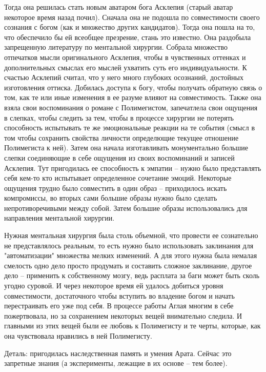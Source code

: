 \documentclass[12pt,a4paper]{article}
\begin{document}
Тогда она решилась стать новым аватаром бога Асклепия (старый аватар некоторое время назад почил). Сначала она не подошла по совместимости своего сознания с богом (как и множество других кандидатов). Тогда она пошла на то, что обеспечило бы ей всеобщее презрение, стань это известно. Она раздобыла запрещенную литературу по ментальной хирургии. Собрала множество отпечатков мысли оригинального Асклепия, чтобы в чувственных оттенках и дополнительных смыслах его мыслей ухватить суть его индивидуальности. К счастью Асклепий считал, что у него много глубоких осознаний, достойных изготовления оттиска. Добилась доступа к богу, чтобы получать обратную связь о том, как те или иные изменения в ее разуме влияют на совместимость. Также она взяла свои воспоминания о романе с Полимегистом, запечатлела свои ощущения в слепках, чтобы следить за тем, чтобы в процессе хирургии не потерять способность испытывать те же эмоциональные реакции на те события (смысл в том чтобы сохранить свойства личности определющие текущее отношение Полимегиста к ней). Затем она начала изготавливать монументально большие слепки соединяющие в себе ощущения из своих воспоминаний и записей Асклепия. Тут пригодилась ее способность к эмпатии -- нужно было представлять себя кем-то кто испытывает определенное сочетание эмоций. Некоторые ощущения трудно было совместить в один образ -- приходилось искать компромиссы, во вторых сами большие образы нужно было сделать непротиворечивыми между собой. Затем большие образы использовались для направления ментальной хирургии.

Нужная ментальная хирургия была столь объемной, что провести ее сознательно не представлялось реальным, то есть нужно было использовать заклинания для "автоматизации" множества мелких изменений. А для этого нужна была немалая смелость одно дело просто продумать и составить сложное заклинание, другое дело -- применить к собственному мозгу, ведь расплата за баги может быть сколь угодно суровой. И через некоторое время ей удалось добиться уровня совместимости, достаточного чтобы вступить во владение богом и начать перестраивать его уже под себя. В процессе работы Аглая многим в себе пожертвовала, но за сохранением некоторых вещей внимательно следила. И главными из этих вещей были ее любовь к Полимегисту и те черты, которые, как она чувствовала нравились в ней Полимегисту.

Деталь: пригодилась наследственная память и умения Арата. Сейчас это запретные знания (а эксперименты, лежащие в их основе -- тем более).
\end{document}
